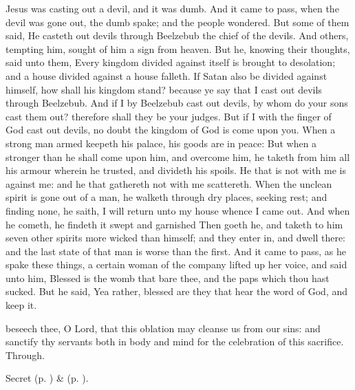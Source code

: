  Jesus was casting out a devil, and it was dumb. And it came to pass, when the devil was gone out, the dumb spake; and the people wondered. But some of them said, He casteth out devils through Beelzebub the chief of the devils. And others, tempting him, sought of him a sign from heaven. But he, knowing their thoughts, said unto them, Every kingdom divided against itself is brought to desolation; and a house divided against a house falleth. If Satan also be divided against himself, how shall his kingdom stand? because ye say that I cast out devils through Beelzebub. And if I by Beelzebub cast out devils, by whom do your sons cast them out? therefore shall they be your judges. But if I with the finger of God cast out devils, no doubt the kingdom of God is come upon you. When a strong man armed keepeth his palace, his goods are in peace: But when a stronger than he shall come upon him, and overcome him, he taketh from him all his armour wherein he trusted, and divideth his spoils. He that is not with me is against me: and he that gathereth not with me scattereth. When the unclean spirit is gone out of a man, he walketh through dry places, seeking rest; and finding none, he saith, I will return unto my house whence I came out. And when he cometh, he findeth it swept and garnished Then goeth he, and taketh to him seven other spirits more wicked than himself; and they enter in, and dwell there: and the last state of that man is worse than the first. And it came to pass, as he spake these things, a certain woman of the company lifted up her voice, and said unto him, Blessed is the womb that bare thee, and the paps which thou hast sucked. But he said, Yea rather, blessed are they that hear the word of God, and keep it.


\secret
{} beseech thee, O Lord, that this oblation may cleanse us from our sins: and sanctify thy servants both in body and mind for the celebration of this sacrifice. Through.
\begin{rubric}
     Secret  (p. \pageref{AshWednesdayMassSecret}) \&   (p. \pageref{SPLivingDeparted}).
\end{rubric}


